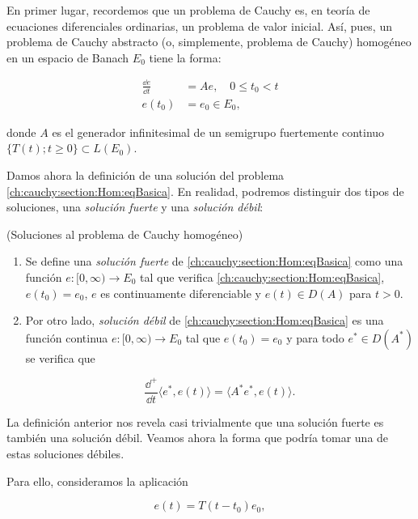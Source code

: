 En primer lugar, recordemos que un problema de Cauchy es, en teoría de ecuaciones diferenciales ordinarias, un problema de valor inicial. Así, pues, un problema de Cauchy abstracto (o, simplemente, problema de Cauchy) homogéneo en un espacio de Banach $E_0$ tiene la forma:

\begin{align}
    \label{ch:cauchy:section:Hom:eqBasica}
    \frac{\dd e}{\dd t} &= Ae, \quad 0 \leq t_0 < t\\
    e(t_0) &= e_0 \in E_0,
\end{align}

donde $A$ es el generador infinitesimal de un semigrupo fuertemente continuo $\{T(t) ; t \geq 0\} \subset L(E_0)$.

Damos ahora la definición de una solución del problema \eqref{ch:cauchy:section:Hom:eqBasica}. En realidad, podremos distinguir dos tipos de soluciones, una \textit{solución fuerte} y una \textit{solución débil}:\\

\begin{Definicion}{(Soluciones al problema de Cauchy homogéneo)}
    \label{ch:cauchy:section:Hom:def:soluciones}

    \begin{enumerate}[label=\alph*)]
        \item Se define una \textit{solución fuerte} de \eqref{ch:cauchy:section:Hom:eqBasica} como una función $e : [0,\infty) \rightarrow E_0$ tal que verifica \eqref{ch:cauchy:section:Hom:eqBasica}, $e(t_0) = e_0$, $e$ es continuamente diferenciable y $e(t) \in D(A)$ para $t > 0$.

        \item Por otro lado, \textit{solución débil} de \eqref{ch:cauchy:section:Hom:eqBasica} es una función continua $e : [0,\infty) \rightarrow E_0$ tal que $e(t_0) = e_0$ y para todo $e^* \in D(A^*)$ se verifica que

        \[\frac{\dd^+}{\dd t}\langle e^*, e(t) \rangle = \langle A^*e^*, e(t)\rangle.\]
    \end{enumerate}
\end{Definicion}

La definición anterior nos revela casi trivialmente que una solución fuerte es también una solución débil. Veamos ahora la forma que podría tomar una de estas soluciones débiles.

Para ello, consideramos la aplicación

\[e(t) = T(t-t_0)e_0,\]

